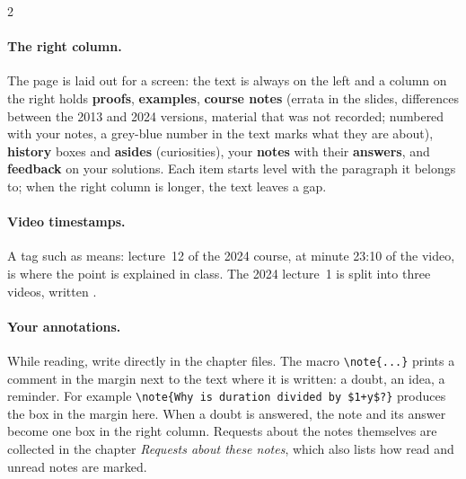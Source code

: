 \ifdefined\publicmode\documentclass[11pt,oneside,openany]{book}\else\documentclass[12pt,oneside,openany]{book}\fi
\begin{document}
\begin{paracol}{2}
\paragraph{The right column.} The page is laid out for a screen: the text is always on the left and a
column on the right holds \textcolor{thmcol}{\textbf{proofs}}, \textcolor{intcol}{\textbf{examples}},
\textcolor{srccol}{\textbf{course notes}} (errata in the slides, differences between the 2013 and 2024
versions, material that was not recorded; numbered with your notes, a grey-blue number in the text marks
what they are about), \textcolor{histcol}{\textbf{history}} boxes and
\textcolor{histcol}{\textbf{asides}} (curiosities), your \textcolor{notecol!80!black}{\textbf{notes}} with their
\textcolor{anscol}{\textbf{answers}}, and \textcolor{exerdark}{\textbf{feedback}} on your solutions. Each item
starts level with the paragraph it belongs to; when the right column is longer, the text leaves a gap.

\paragraph{Video timestamps.} A tag such as  means: lecture~12 of the 2024
course, at minute 23:10 of the video, is where the point is explained in class. The 2024
lecture~1 is split into three videos, written .

\paragraph{Your annotations.} While reading, write directly in the chapter files. The macro \verb|\note{...}| prints a comment in the margin next to the text where it is written: a doubt, an idea, a reminder. For example \verb|\note{Why is duration divided by $1+y$?}| produces the box in the margin here. When a doubt is answered, the note and its answer become one box in the right column. Requests about the notes themselves are collected in the chapter \emph{Requests about these notes}, which also lists how read and unread notes are marked.

\flushside
\end{paracol}
\fi

\ifdefined\publicmode\else\fi

\tableofcontents
\end{document}
